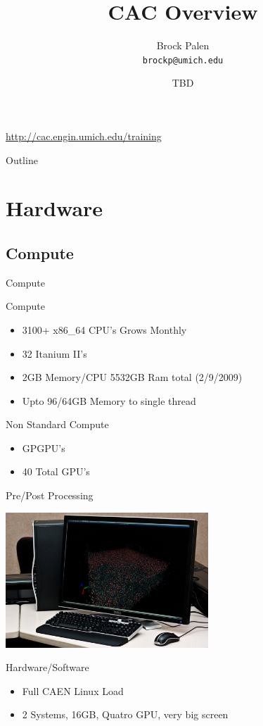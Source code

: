 \documentclass[handout]{beamer}
\title[CAC Overview] {CAC Overview}
\author{Brock Palen\\ \texttt{brockp@umich.edu}}
\date{TBD}
\begin{document}
  \begin{frame}
    \titlepage
    \url{http://cac.engin.umich.edu/training}
  \end{frame}

  \begin{frame}{Outline}
    \tableofcontents
  \end{frame}
  
  \section {Hardware}
   \subsection{Compute}
    \begin{frame}{Compute}
     \begin{block}{Compute}
      \begin{itemize}
       \item{3100+ x86\_64 CPU's Grows Monthly}
       \item{32 Itanium II's}
       \item{2GB Memory/CPU 5532GB Ram total (2/9/2009)}
       \item{Upto 96/64GB Memory to single thread}
      \end{itemize}
     \end{block}
     \begin{block}{Non Standard Compute}
      \begin{itemize}
       \item<2->{GPGPU's}
       \item<2->{40 Total GPU's}
      \end{itemize}
     \end{block}
    \end{frame}
    \begin{frame}{Pre/Post Processing}
      \begin{center}\includegraphics[height=2.0in]{3dlab}\end{center}
      \begin{block}{Hardware/Software}
       \begin{itemize}
         \item Full CAEN Linux Load
         \item 2 Systems, 16GB, Quatro GPU, very big screen
       \end{itemize}
      \end{block}
    \end{frame}
\end{document}
